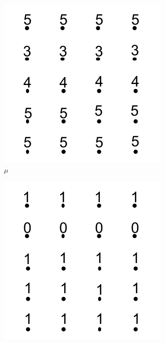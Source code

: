 \begin{figure}[!b]
\vspace{-5mm}
\centering
\begin{subfigure}{0.243\linewidth}
\includegraphics[width=\linewidth]{Images/mu.pdf}
\vspace{-5mm}
\caption{${\mu}$}
\label{fig:mu}
\end{subfigure}
\begin{subfigure}{0.243\linewidth}
\includegraphics[width=\linewidth]{Images/bvolumeT.pdf}

\end{subfigure}
\end{figure}
